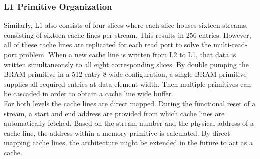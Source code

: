 \subsubsection{L1 Primitive Organization}
Similarly, L1 also consists of four slices where each slice houses sixteen streams, consisting of sixteen cache lines per stream. This results in 256 entries. However, all of these cache lines are replicated for each read port to solve the multi-read-port problem. When a new cache line is written from L2 to L1, that data is written simultaneously to all eight corresponding slices. By double pumping the BRAM primitive in a 512 entry \SI{8}{\byte} wide configuration, a single BRAM primitive supplies all required entries at data element width. Then multiple primitives can be cascaded in order to obtain a cache line wide buffer.\\
For both levels the cache lines are direct mapped. During the functional reset of a stream, a start and end address are provided from which cache lines are automatically fetched. Based on the stream number and the physical address of a cache line, the address within a memory primitive is calculated. By direct mapping cache lines, the architecture might be extended in the future to act as a cache.





